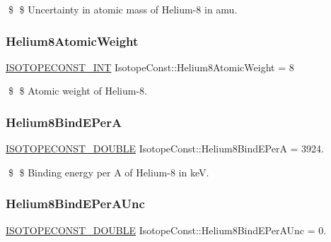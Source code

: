 \$ \$ Uncertainty in atomic mass of Helium-\/8 in amu. \mbox{\label{group___isotope_const-_helium-_he8_ga83b93681c2e2c98433b1160930086e81}} 
\subsubsection{\texorpdfstring{Helium8\+Atomic\+Weight}{Helium8AtomicWeight}}
{\footnotesize\ttfamily \mbox{\hyperlink{group___isotope_const-_macros_ga5f18360b3e99483a35c32d789e62621c}{I\+S\+O\+T\+O\+P\+E\+C\+O\+N\+S\+T\+\_\+\+I\+NT}} Isotope\+Const\+::\+Helium8\+Atomic\+Weight = 8}

\$ \$ Atomic weight of Helium-\/8. \mbox{\label{group___isotope_const-_helium-_he8_gaa8b0ea973a8b9dd8c9b2e6241b03400e}} 
\subsubsection{\texorpdfstring{Helium8\+Bind\+E\+PerA}{Helium8BindEPerA}}
{\footnotesize\ttfamily \mbox{\hyperlink{group___isotope_const-_macros_ga8f45a7272ce02c0b4c65c44636ed719a}{I\+S\+O\+T\+O\+P\+E\+C\+O\+N\+S\+T\+\_\+\+D\+O\+U\+B\+LE}} Isotope\+Const\+::\+Helium8\+Bind\+E\+PerA = 3924.}

\$ \$ Binding energy per A of Helium-\/8 in keV. \mbox{\label{group___isotope_const-_helium-_he8_ga5d45fa98b16d4fa7d02fa718a5260ff0}} 
\subsubsection{\texorpdfstring{Helium8\+Bind\+E\+Per\+A\+Unc}{Helium8BindEPerAUnc}}
{\footnotesize\ttfamily \mbox{\hyperlink{group___isotope_const-_macros_ga8f45a7272ce02c0b4c65c44636ed719a}{I\+S\+O\+T\+O\+P\+E\+C\+O\+N\+S\+T\+\_\+\+D\+O\+U\+B\+LE}} Isotope\+Const\+::\+Helium8\+Bind\+E\+Per\+A\+Unc = 0.}

